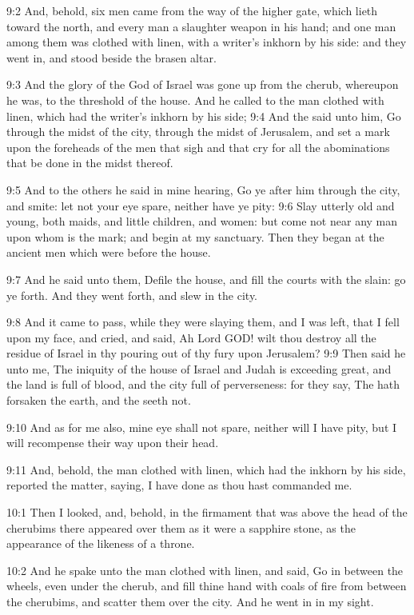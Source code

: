 9:2 And, behold, six men came from the way of the higher gate, which lieth toward the north, and every man a slaughter weapon in his hand; and one man among them was clothed with linen, with a writer's inkhorn by his side: and they went in, and stood beside the brasen altar.

9:3 And the glory of the God of Israel was gone up from the cherub, whereupon he was, to the threshold of the house. And he called to the man clothed with linen, which had the writer's inkhorn by his side; 9:4 And the \LORD said unto him, Go through the midst of the city, through the midst of Jerusalem, and set a mark upon the foreheads of the men that sigh and that cry for all the abominations that be done in the midst thereof.

9:5 And to the others he said in mine hearing, Go ye after him through the city, and smite: let not your eye spare, neither have ye pity: 9:6 Slay utterly old and young, both maids, and little children, and women: but come not near any man upon whom is the mark; and begin at my sanctuary. Then they began at the ancient men which were before the house.

9:7 And he said unto them, Defile the house, and fill the courts with the slain: go ye forth. And they went forth, and slew in the city.

9:8 And it came to pass, while they were slaying them, and I was left, that I fell upon my face, and cried, and said, Ah Lord GOD! wilt thou destroy all the residue of Israel in thy pouring out of thy fury upon Jerusalem?  9:9 Then said he unto me, The iniquity of the house of Israel and Judah is exceeding great, and the land is full of blood, and the city full of perverseness: for they say, The \LORD hath forsaken the earth, and the \LORD seeth not.

9:10 And as for me also, mine eye shall not spare, neither will I have pity, but I will recompense their way upon their head.

9:11 And, behold, the man clothed with linen, which had the inkhorn by his side, reported the matter, saying, I have done as thou hast commanded me.

10:1 Then I looked, and, behold, in the firmament that was above the head of the cherubims there appeared over them as it were a sapphire stone, as the appearance of the likeness of a throne.

10:2 And he spake unto the man clothed with linen, and said, Go in between the wheels, even under the cherub, and fill thine hand with coals of fire from between the cherubims, and scatter them over the city. And he went in in my sight.

